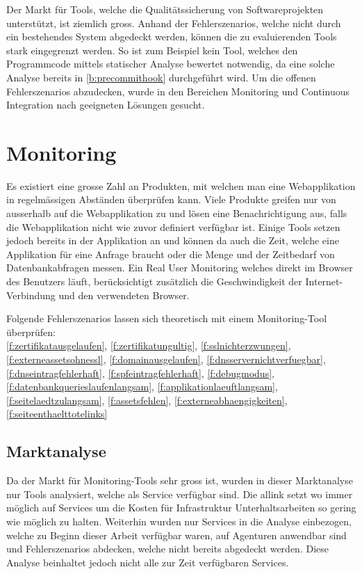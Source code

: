 
Der Markt für Tools, welche die Qualitätssicherung von Softwareprojekten unterstützt, ist ziemlich gross. Anhand der Fehlerszenarios, welche nicht durch ein bestehendes System abgedeckt werden, können die zu evaluierenden Tools stark eingegrenzt werden. So ist zum Beispiel kein Tool, welches den Programmcode mittels statischer Analyse bewertet notwendig, da eine solche Analyse bereits in \ref{b:precommithook} durchgeführt wird. Um die offenen Fehlerszenarios abzudecken, wurde in den Bereichen Monitoring und Continuous Integration nach geeigneten Lösungen gesucht.

\section{Monitoring}
\label{sec:monitoring_evaluation}
Es existiert eine grosse Zahl an Produkten, mit welchen man eine Webapplikation in regelmässigen Abständen überprüfen kann. Viele Produkte greifen nur von ausserhalb auf die Webapplikation zu und lösen eine Benachrichtigung aus, falls die Webapplikation nicht wie zuvor definiert verfügbar ist. Einige Tools setzen jedoch bereits in der Applikation an und können da auch die Zeit, welche eine Applikation für eine Anfrage braucht oder die Menge und der Zeitbedarf von Datenbankabfragen messen. Ein Real User Monitoring welches direkt im Browser des Benutzers läuft, berücksichtigt zusätzlich die Geschwindigkeit der Internet-Verbindung und den verwendeten Browser.

Folgende Fehlerszenarios lassen sich theoretisch mit einem Monitoring-Tool überprüfen:\\
\ref{f:zertifikatausgelaufen}, \ref{f:zertifikatungultig}, \ref{f:sslnichterzwungen}, \ref{f:externeassetsohnessl}, \ref{f:domainausgelaufen}, \ref{f:dnsservernichtverfuegbar}, \ref{f:dnseintragfehlerhaft}, \ref{f:spfeintragfehlerhaft}, \ref{f:debugmodus}, \ref{f:datenbankquerieslaufenlangsam}, \ref{f:applikationlaeuftlangsam}, \ref{f:seitelaedtzulangsam}, \ref{f:assetsfehlen}, \ref{f:externeabhaengigkeiten}, \ref{f:seiteenthaelttotelinks}

\subsection{Marktanalyse}
\label{sub:marktanalyse}
Da der Markt für Monitoring-Tools sehr gross ist, wurden in dieser Marktanalyse nur Tools analysiert, welche als Service verfügbar sind. Die allink setzt wo immer möglich auf Services um die Kosten für Infrastruktur Unterhaltsarbeiten so gering wie möglich zu halten. Weiterhin wurden nur Services in die Analyse einbezogen, welche zu Beginn dieser Arbeit verfügbar waren, auf Agenturen anwendbar sind und Fehlerszenarios abdecken, welche nicht bereits abgedeckt werden. Diese Analyse beinhaltet jedoch nicht alle zur Zeit verfügbaren Services.

